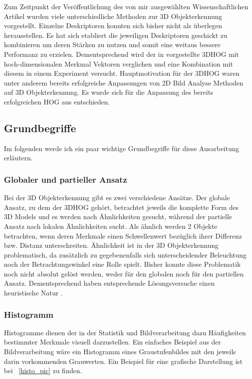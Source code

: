 Zum Zeitpunkt der Veröffentlichung des von mir ausgewählten Wissenschaftlichen Artikel wurden viele
unterschiedliche Methoden zur 3D Objekterkennung vorgestellt. Einzelne Deskriptoren konnten sich 
bisher nicht als überlegen herausstellen. Es hat sich etabliert die jeweiligen Deskriptoren
geschickt zu kombinieren um deren Stärken zu nutzen und somit eine weitaus bessere Performanz zu erzielen.
Dementsprechend wird der in \cite{scherer2010histograms} vorgestellte 3DHOG mit hoch-dimensionalen Merkmal Vektoren
verglichen und eine Kombination mit diesem in einem Experiment versucht.
\newline
Hauptmotivation für der 3DHOG waren unter anderem bereits erfolgreiche Anpassungen von 2D Bild Analyse Methoden auf 3D Objekterkennung. Es wurde sich für die Anpassung des bereits erfolgreichen HOG aus \cite{dalal2005histograms} entschieden.


\subsection{Grundbegriffe}
Im folgenden werde ich ein paar wichtige Grundbegriffe für diese Ausarbeitung erläutern. 

\subsubsection{Globaler und partieller Ansatz}
Bei der 3D Objekterkennung gibt es zwei verschiedene Ansätze. Der globale Ansatz, zu dem der 3DHOG gehört, betrachtet jeweils die komplette Form des 3D Models und es werden nach Ähnlichkeiten gesucht, während der partielle Ansatz nach lokalen Ähnlichkeiten sucht. Als ähnlich werden 2 Objekte betrachten, wenn deren Merkmale einen Schwellenwert bezüglich ihrer Differenz bzw. Distanz unterschreiten. Ähnlichkeit ist in der 3D Objekterkennung problematisch, da zusätzlich zu gegebenenfalls sich unterscheidender Beleuchtung noch der Betrachtungswinkel eine Rolle spielt. Bisher konnte diese Problematik noch nicht absolut gelöst werden, weder für den globalen noch für den partiellen Ansatz. Dementsprechend haben entsprechende Lösungsversuche einen heuristische Natur \cite{scherer2010histograms}.

\subsubsection{Histogramm}
Histogramme dienen der in der Statistik und Bildverarbeitung dazu Häufigkeiten bestimmter Merkmale
visuell darzustellen. Ein einfaches Beispiel aus der Bildverarbeitung wäre ein Histogramm eines
Graustufenbildes mit den jeweils darin vorkommenden Grauwerten. Ein Beispiel für eine grafische Darstellung ist bei \figurename~\ref{histo_pic} zu finden.


